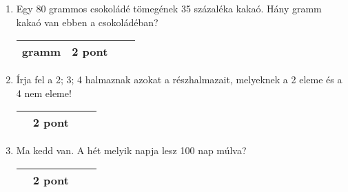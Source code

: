 \documentclass[12pt,a4paper]{article}
\begin{document}
\newpage
\begin{enumerate}[leftmargin=*,label=\textbf{\large\arabic*.}]
    \item 
    Egy 80 grammos csokoládé tömegének 35 százaléka kakaó. Hány gramm kakaó van ebben a csokoládéban? 

    \vspace{4cm}
    
    \begin{flushright}
        \begin{tabular}{|M{6cm}|M{2cm}|M{2cm}|N}
        \hline
        \vspace{20pt}
        \hspace{1cm}gramm
         & 
        \vspace{20pt}
         2 pont  &  \\[30pt]
        \hline
        \end{tabular}
    \end{flushright}

    \item
    Írja fel a {2; 3; 4} halmaznak azokat a részhalmazait, melyeknek a 2 eleme és a 4 nem
eleme! 
    \vspace{4cm}

    \begin{flushright}
        \begin{tabular}{|M{6cm}|M{2cm}|M{2cm}|N}
        \hline
         & 
        \vspace{20pt}
         2 pont  &  \\[30pt]
        \hline
        \end{tabular}
    \end{flushright}


    \item
    Ma kedd van. A hét melyik napja lesz 100 nap múlva? 
    \vspace{4cm}

    \begin{flushright}
        \begin{tabular}{|M{6cm}|M{2cm}|M{2cm}|N}
        \hline
         & 
        \vspace{20pt}
         2 pont  &  \\[30pt]
        \hline
        \end{tabular}
    \end{flushright}

\newpage


\end{enumerate}
\end{document}
